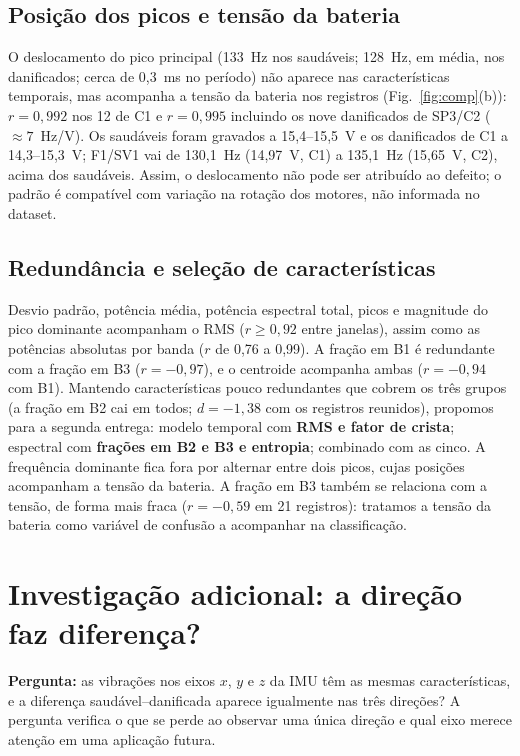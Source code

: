 \documentclass[conference,a4paper]{IEEEtran}
\begin{document}
\subsection{Posição dos picos e tensão da bateria}
O deslocamento do pico principal (133~Hz nos saudáveis; 128~Hz, em média, nos danificados; cerca de 0,3~ms no período) não aparece nas características temporais, mas acompanha a tensão da bateria nos registros (Fig.~\ref{fig:comp}(b)): $r=0{,}992$ nos 12 de C1 e $r=0{,}995$ incluindo os nove danificados de SP3/C2 ($\approx7$~Hz/V). Os saudáveis foram gravados a 15,4--15,5~V e os danificados de C1 a 14,3--15,3~V; F1/SV1 vai de 130,1~Hz (14,97~V, C1) a 135,1~Hz (15,65~V, C2), acima dos saudáveis. Assim, o deslocamento não pode ser atribuído ao defeito; o padrão é compatível com variação na rotação dos motores, não informada no dataset.

\subsection{Redundância e seleção de características}
Desvio padrão, potência média, potência espectral total, picos e magnitude do pico dominante acompanham o RMS ($r\geq0{,}92$ entre janelas), assim como as potências absolutas por banda ($r$ de 0,76 a 0,99). A fração em B1 é redundante com a fração em B3 ($r=-0{,}97$), e o centroide acompanha ambas ($r=-0{,}94$ com B1). Mantendo características pouco redundantes que cobrem os três grupos (a fração em B2 cai em todos; $d=-1{,}38$ com os registros reunidos), propomos para a segunda entrega: modelo temporal com \textbf{RMS e fator de crista}; espectral com \textbf{frações em B2 e B3 e entropia}; combinado com as cinco. A frequência dominante fica fora por alternar entre dois picos, cujas posições acompanham a tensão da bateria. A fração em B3 também se relaciona com a tensão, de forma mais fraca ($r=-0{,}59$ em 21 registros): tratamos a tensão da bateria como variável de confusão a acompanhar na classificação.

\section{Investigação adicional: a direção faz diferença?}
\textbf{Pergunta:} as vibrações nos eixos $x$, $y$ e $z$ da IMU têm as mesmas características, e a diferença saudável--danificada aparece igualmente nas três direções? A pergunta verifica o que se perde ao observar uma única direção e qual eixo merece atenção em uma aplicação futura.
\end{document}
